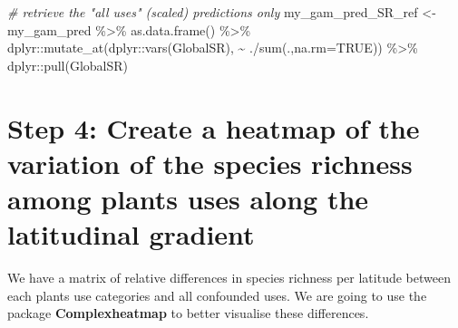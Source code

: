\documentclass[
]{article}
\newenvironment{Shaded}{\begin{snugshade}}{\end{snugshade}}
\newcommand{\AttributeTok}[1]{\textcolor[rgb]{0.77,0.63,0.00}{#1}}
\newcommand{\CommentTok}[1]{\textcolor[rgb]{0.56,0.35,0.01}{\textit{#1}}}
\newcommand{\ConstantTok}[1]{\textcolor[rgb]{0.00,0.00,0.00}{#1}}
\newcommand{\FunctionTok}[1]{\textcolor[rgb]{0.00,0.00,0.00}{#1}}
\newcommand{\NormalTok}[1]{#1}
\newcommand{\OtherTok}[1]{\textcolor[rgb]{0.56,0.35,0.01}{#1}}
\newcommand{\SpecialCharTok}[1]{\textcolor[rgb]{0.00,0.00,0.00}{#1}}
\begin{document}
\begin{Shaded}
\begin{Highlighting}[]
\CommentTok{\# retrieve the "all uses" (scaled) predictions only}
\NormalTok{my\_gam\_pred\_SR\_ref }\OtherTok{\textless{}{-}}\NormalTok{ my\_gam\_pred }\SpecialCharTok{\%\textgreater{}\%}
  \FunctionTok{as.data.frame}\NormalTok{() }\SpecialCharTok{\%\textgreater{}\%}
\NormalTok{  dplyr}\SpecialCharTok{::}\FunctionTok{mutate\_at}\NormalTok{(dplyr}\SpecialCharTok{::}\FunctionTok{vars}\NormalTok{(GlobalSR), }\SpecialCharTok{\textasciitilde{}}\NormalTok{ .}\SpecialCharTok{/}\FunctionTok{sum}\NormalTok{(.,}\AttributeTok{na.rm=}\ConstantTok{TRUE}\NormalTok{)) }\SpecialCharTok{\%\textgreater{}\%}
\NormalTok{  dplyr}\SpecialCharTok{::}\FunctionTok{pull}\NormalTok{(GlobalSR)}
\end{Highlighting}
\end{Shaded}

\hypertarget{step-4-create-a-heatmap-of-the-variation-of-the-species-richness-among-plants-uses-along-the-latitudinal-gradient}{%
\section{Step 4: Create a heatmap of the variation of the species
richness among plants uses along the latitudinal
gradient}\label{step-4-create-a-heatmap-of-the-variation-of-the-species-richness-among-plants-uses-along-the-latitudinal-gradient}}

We have a matrix of relative differences in species richness per
latitude between each plants use categories and all confounded uses. We
are going to use the package \textbf{Complexheatmap} to better visualise
these differences.
\end{document}
